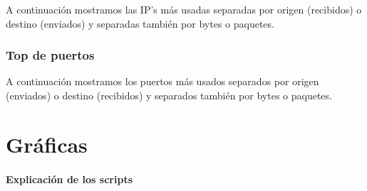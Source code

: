 \documentclass[nochap]{apuntes}
\begin{document}
A continuación mostramos las IP's más usadas separadas por origen (recibidos) o destino (enviados) y separadas también por bytes o paquetes.

\newpage
\subsubsection{Top de puertos}

A continuación mostramos los puertos más usados separados por origen (enviados) o destino (recibidos) y separados también por bytes o paquetes.

\newpage
\section{Gr\'aficas}

\paragraph{Explicación de los scripts}
\end{document}
